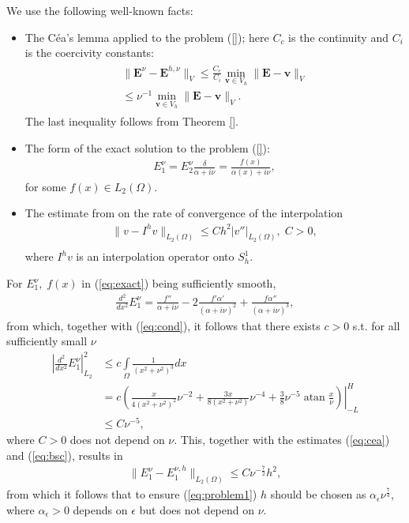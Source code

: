 \documentclass{article}
\begin{document}
We use the following well-known facts:
\begin{itemize}
 \item The C\'ea's lemma applied to the problem (\ref{}); here $C_c$ is the continuity and $C_i$ is the coercivity constants:
\begin{align}
\label{eq:cea}
\begin{split}
 \|\mathbf{E}^{\nu}-\mathbf{E}^{h,\nu}\|_{V}\leq \frac{C_c}{C_i}\min_{\mathbf{v}\in V_h}\|\mathbf{E}-\mathbf{v}\|_{V}\\
 \leq \nu^{-1}\min_{\mathbf{v}\in V_h}\|\mathbf{E}-\mathbf{v}\|_{V}.
 \end{split}
\end{align}
The last inequality follows from Theorem \ref{}.  
\item The form of the exact solution to the problem (\ref{}):
\begin{align}
\label{eq:exact}
 E_{1}^{\nu}=E_{2}^{\nu}\frac{\delta}{\alpha+i\nu}=\frac{f(x)}{\alpha(x)+i\nu},
\end{align}
for some $f(x)\in L_{2}(\Omega)$.
\item The estimate from \cite[Chapter 0]{Brenner_Scott} on the rate of convergence of the interpolation 
\begin{align}
\label{eq:bsc}
 \|v-I^{h}v\|_{L_{2}(\Omega)}\leq Ch^2|v''|_{L_{2}(\Omega)},\; C>0,\\
\end{align}
where $I^{h}v$ is an interpolation operator onto $S_{h}^{1}$.
\end{itemize}
For $E_{1}^{\nu},\;f(x)$ in (\ref{eq:exact}) being sufficiently smooth, 
\begin{align*}
 \frac{d^2}{dx^2}E_{1}^{\nu}=\frac{f''}{\alpha+i\nu}-2\frac{f'\alpha'}{(\alpha+i\nu)^2}+\frac{f\alpha''}{(\alpha+i\nu)^3},
\end{align*}
from which, together with (\ref{eq:cond}), it follows that there exists $c>0$ s.t. for all sufficiently small $\nu$ 
\begin{align*}
 \left|  \frac{d^2}{dx^2}E_{1}^{\nu}\right|_{L_2}^{2}&\leq c\int\limits_{\Omega}\frac{1}{(x^2+\nu^2)^{3}}dx\\
 &=c\left.
 \left(\frac{x}{4(x^2+\nu^2)^2}\nu^{-2}+\frac{3x}{8(x^2+\nu^2)}\nu^{-4}+\frac{3}{8}\nu^{-5}\operatorname{atan}\frac{x}{\nu}\right)\right|_{-L}^{H}\\
 &\leq C\nu^{-5},\; 
\end{align*}
where $C>0$ does not depend on $\nu$. This, together with the estimates (\ref{eq:cea}) and (\ref{eq:bsc}), results in 
\begin{align*}
 \|E^{\nu}_{1}-E^{\nu,h}_{1}\|_{L_{2}(\Omega)}\leq C\nu^{-\frac{7}{2}}h^2,
\end{align*}
from which it follows that to ensure (\ref{eq:problem1}) $h$ should be chosen as $\alpha_{\epsilon}\nu^{\frac{7}{4}}$, 
where $\alpha_{\epsilon}>0$ depends on $\epsilon$ but does not depend on $\nu$. 
\end{document}
